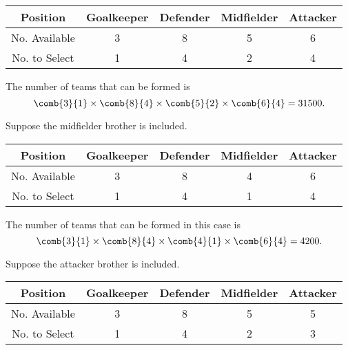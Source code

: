 \begin{solution}
    \begin{ppart}
        \begin{table}[H]
            \centering
            \begin{tabular}{|c|c|c|c|c|}
            \hline
            Position & Goalkeeper & Defender & Midfielder & Attacker \\ \hline
            No. Available & 3 & 8 & 5 & 6 \\ \hline
            No. to Select & 1 & 4 & 2 & 4 \\ \hline
            \end{tabular}
        \end{table}

        The number of teams that can be formed is \[\comb{3}{1} \times \comb{8}{4} \times \comb{5}{2} \times \comb{6}{4} = 31500.\]
    \end{ppart}
    \begin{ppart}
         Suppose the midfielder brother is included.

        \begin{table}[H]
            \centering
            \begin{tabular}{|c|c|c|c|c|}
            \hline
            Position & Goalkeeper & Defender & Midfielder & Attacker \\ \hline
            No. Available & 3 & 8 & 4 & 6 \\ \hline
            No. to Select & 1 & 4 & 1 & 4 \\ \hline
            \end{tabular}
        \end{table}

        The number of teams that can be formed in this case is \[\comb{3}{1} \times \comb{8}{4} \times \comb{4}{1} \times \comb{6}{4} = 4200.\]

         Suppose the attacker brother is included.

        \begin{table}[H]
            \centering
            \begin{tabular}{|c|c|c|c|c|}
            \hline
            Position & Goalkeeper & Defender & Midfielder & Attacker \\ \hline
            No. Available & 3 & 8 & 5 & 5 \\ \hline
            No. to Select & 1 & 4 & 2 & 3 \\ \hline
            \end{tabular}
        \end{table}


\end{ppart}
\end{solution}
